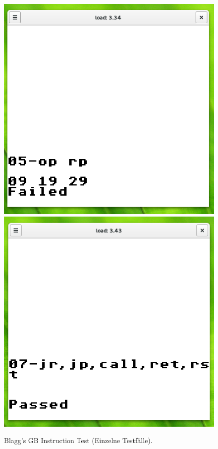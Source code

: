 \documentclass[a4paper]{scrartcl}
\begin{document}
\begin{figure}[H]
  \includegraphics[width=\linewidth]{img/test_rom_fail}
\endminipage\hfill
{}
  \includegraphics[width=\linewidth]{img/test_rom_pass}
\endminipage
\caption{Blagg's GB Instruction Test (Einzelne Testfälle).}
\label{img:inst_test}
\end{figure}
\end{document}
